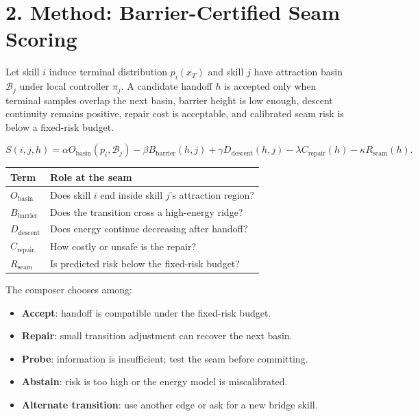 \documentclass[10pt]{article}
\begin{document}
\newpage
\section*{2. Method: Barrier-Certified Seam Scoring}

Let skill $i$ induce terminal distribution $p_i(x_T)$ and skill $j$ have attraction basin $\mathcal{B}_j$ under local controller $\pi_j$. A candidate handoff $h$ is accepted only when terminal samples overlap the next basin, barrier height is low enough, descent continuity remains positive, repair cost is acceptable, and calibrated seam risk is below a fixed-risk budget.

\[
S(i,j,h)=\alpha O_{\mathrm{basin}}(p_i,\mathcal{B}_j)-\beta B_{\mathrm{barrier}}(h,j)+\gamma D_{\mathrm{descent}}(h,j)-\lambda C_{\mathrm{repair}}(h)-\kappa R_{\mathrm{seam}}(h).
\]

\begin{center}
\begin{tabular}{ll}
\toprule
Term & Role at the seam \\
\midrule
$O_{\mathrm{basin}}$ & Does skill $i$ end inside skill $j$'s attraction region? \\
$B_{\mathrm{barrier}}$ & Does the transition cross a high-energy ridge? \\
$D_{\mathrm{descent}}$ & Does energy continue decreasing after handoff? \\
$C_{\mathrm{repair}}$ & How costly or unsafe is the repair? \\
$R_{\mathrm{seam}}$ & Is predicted risk below the fixed-risk budget? \\
\bottomrule
\end{tabular}
\end{center}

The composer chooses among:

\begin{itemize}
\item \textbf{Accept}: handoff is compatible under the fixed-risk budget.
\item \textbf{Repair}: small transition adjustment can recover the next basin.
\item \textbf{Probe}: information is insufficient; test the seam before committing.
\item \textbf{Abstain}: risk is too high or the energy model is miscalibrated.
\item \textbf{Alternate transition}: use another edge or ask for a new bridge skill.
\end{itemize}
\end{document}

